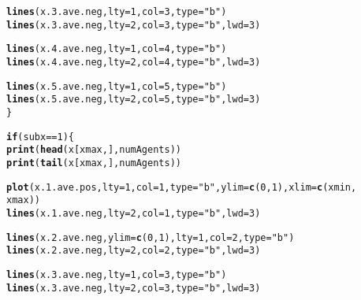 \documentclass{article}\usepackage[]{graphicx}\usepackage[]{color}
\makeatletter
\newcommand{\hlnum}[1]{\textcolor[rgb]{0.686,0.059,0.569}{#1}}%
\newcommand{\hlstr}[1]{\textcolor[rgb]{0.192,0.494,0.8}{#1}}%
\newcommand{\hlopt}[1]{\textcolor[rgb]{0,0,0}{#1}}%
\newcommand{\hlstd}[1]{\textcolor[rgb]{0.345,0.345,0.345}{#1}}%
\newcommand{\hlkwa}[1]{\textcolor[rgb]{0.161,0.373,0.58}{\textbf{#1}}}%
\newcommand{\hlkwc}[1]{\textcolor[rgb]{0.333,0.667,0.333}{#1}}%
\newcommand{\hlkwd}[1]{\textcolor[rgb]{0.737,0.353,0.396}{\textbf{#1}}}%
\newenvironment{kframe}{%
 \def\at@end@of@kframe{}%
 \ifinner\ifhmode%
  \def\at@end@of@kframe{\end{minipage}}%
  \begin{minipage}{\columnwidth}%
 \fi\fi%
 \def\FrameCommand##1{\hskip\@totalleftmargin \hskip-\fboxsep
 \colorbox{shadecolor}{##1}\hskip-\fboxsep
     \hskip-\linewidth \hskip-\@totalleftmargin \hskip\columnwidth}%
 \MakeFramed {\advance\hsize-\width
   \@totalleftmargin\z@ \linewidth\hsize
   \@setminipage}}%
 {\par\unskip\endMakeFramed%
 \at@end@of@kframe}
\newenvironment{knitrout}{}{} %
\makeatother
\begin{document}
\begin{knitrout}
\begin{kframe}
\begin{alltt}
        \hlkwd{lines}\hlstd{(x.3.ave.neg,} \hlkwc{lty} \hlstd{=} \hlnum{1}\hlstd{,} \hlkwc{col} \hlstd{=} \hlnum{3}\hlstd{,} \hlkwc{type} \hlstd{=} \hlstr{"b"}\hlstd{)}
        \hlkwd{lines}\hlstd{(x.3.ave.neg,} \hlkwc{lty} \hlstd{=} \hlnum{2}\hlstd{,} \hlkwc{col} \hlstd{=} \hlnum{3}\hlstd{,} \hlkwc{type} \hlstd{=} \hlstr{"b"}\hlstd{,} \hlkwc{lwd} \hlstd{=} \hlnum{3}\hlstd{)}

        \hlkwd{lines}\hlstd{(x.4.ave.neg,} \hlkwc{lty} \hlstd{=} \hlnum{1}\hlstd{,} \hlkwc{col} \hlstd{=} \hlnum{4}\hlstd{,} \hlkwc{type} \hlstd{=} \hlstr{"b"}\hlstd{)}
        \hlkwd{lines}\hlstd{(x.4.ave.neg,} \hlkwc{lty} \hlstd{=} \hlnum{2}\hlstd{,} \hlkwc{col} \hlstd{=} \hlnum{4}\hlstd{,} \hlkwc{type} \hlstd{=} \hlstr{"b"}\hlstd{,} \hlkwc{lwd} \hlstd{=} \hlnum{3}\hlstd{)}

        \hlkwd{lines}\hlstd{(x.5.ave.neg,} \hlkwc{lty} \hlstd{=} \hlnum{1}\hlstd{,} \hlkwc{col} \hlstd{=} \hlnum{5}\hlstd{,} \hlkwc{type} \hlstd{=} \hlstr{"b"}\hlstd{)}
        \hlkwd{lines}\hlstd{(x.5.ave.neg,} \hlkwc{lty} \hlstd{=} \hlnum{2}\hlstd{,} \hlkwc{col} \hlstd{=} \hlnum{5}\hlstd{,} \hlkwc{type} \hlstd{=} \hlstr{"b"}\hlstd{,} \hlkwc{lwd} \hlstd{=} \hlnum{3}\hlstd{)}
    \hlstd{\}}

    \hlkwa{if} \hlstd{(subx} \hlopt{==} \hlnum{1}\hlstd{) \{}
        \hlkwd{print}\hlstd{(}\hlkwd{head}\hlstd{(x[xmax, ], numAgents))}
        \hlkwd{print}\hlstd{(}\hlkwd{tail}\hlstd{(x[xmax, ], numAgents))}

        \hlkwd{plot}\hlstd{(x.1.ave.pos,} \hlkwc{lty} \hlstd{=} \hlnum{1}\hlstd{,} \hlkwc{col} \hlstd{=} \hlnum{1}\hlstd{,} \hlkwc{type} \hlstd{=} \hlstr{"b"}\hlstd{,} \hlkwc{ylim} \hlstd{=} \hlkwd{c}\hlstd{(}\hlnum{0}\hlstd{,} \hlnum{1}\hlstd{),} \hlkwc{xlim} \hlstd{=} \hlkwd{c}\hlstd{(xmin,}
            \hlstd{xmax))}
        \hlkwd{lines}\hlstd{(x.1.ave.neg,} \hlkwc{lty} \hlstd{=} \hlnum{2}\hlstd{,} \hlkwc{col} \hlstd{=} \hlnum{1}\hlstd{,} \hlkwc{type} \hlstd{=} \hlstr{"b"}\hlstd{,} \hlkwc{lwd} \hlstd{=} \hlnum{3}\hlstd{)}

        \hlkwd{lines}\hlstd{(x.2.ave.neg,} \hlkwc{ylim} \hlstd{=} \hlkwd{c}\hlstd{(}\hlnum{0}\hlstd{,} \hlnum{1}\hlstd{),} \hlkwc{lty} \hlstd{=} \hlnum{1}\hlstd{,} \hlkwc{col} \hlstd{=} \hlnum{2}\hlstd{,} \hlkwc{type} \hlstd{=} \hlstr{"b"}\hlstd{)}
        \hlkwd{lines}\hlstd{(x.2.ave.neg,} \hlkwc{lty} \hlstd{=} \hlnum{2}\hlstd{,} \hlkwc{col} \hlstd{=} \hlnum{2}\hlstd{,} \hlkwc{type} \hlstd{=} \hlstr{"b"}\hlstd{,} \hlkwc{lwd} \hlstd{=} \hlnum{3}\hlstd{)}

        \hlkwd{lines}\hlstd{(x.3.ave.neg,} \hlkwc{lty} \hlstd{=} \hlnum{1}\hlstd{,} \hlkwc{col} \hlstd{=} \hlnum{3}\hlstd{,} \hlkwc{type} \hlstd{=} \hlstr{"b"}\hlstd{)}
        \hlkwd{lines}\hlstd{(x.3.ave.neg,} \hlkwc{lty} \hlstd{=} \hlnum{2}\hlstd{,} \hlkwc{col} \hlstd{=} \hlnum{3}\hlstd{,} \hlkwc{type} \hlstd{=} \hlstr{"b"}\hlstd{,} \hlkwc{lwd} \hlstd{=} \hlnum{3}\hlstd{)}


\end{alltt}
\end{kframe}
\end{knitrout}
\end{document}
